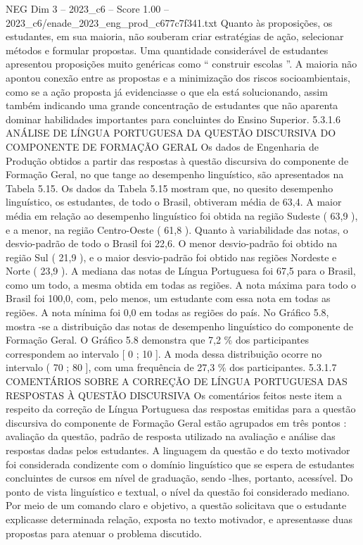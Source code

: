 \begin{textsample}{NEG Dim 3 – 2023\_c6 – Score 1.00 – 2023\_c6/enade\_2023\_eng\_prod\_c677c7f341.txt}
Quanto às proposições, os estudantes, em sua maioria, não souberam criar estratégias de ação, selecionar métodos e formular propostas.
Uma quantidade considerável de estudantes apresentou proposições muito genéricas como “ construir escolas ”.
A maioria não apontou conexão entre as propostas e a minimização dos riscos socioambientais, como se a ação proposta já evidenciasse o que ela está solucionando, assim também indicando uma grande concentração de estudantes que não aparenta dominar habilidades importantes para concluintes do Ensino Superior. 5.3.1.6 ANÁLISE DE LÍNGUA PORTUGUESA DA QUESTÃO DISCURSIVA DO COMPONENTE DE FORMAÇÃO GERAL Os dados de Engenharia de Produção obtidos a partir das respostas à questão discursiva do componente de Formação Geral, no que tange ao desempenho linguístico, são apresentados na Tabela 5.15.
Os dados da Tabela 5.15 mostram que, no quesito desempenho linguístico, os estudantes, de todo o Brasil, obtiveram média de 63,4.
A maior média em relação ao desempenho linguístico foi obtida na região Sudeste ( 63,9 ), e a menor, na região Centro-Oeste ( 61,8 ).
Quanto à variabilidade das notas, o desvio-padrão de todo o Brasil foi 22,6.
O menor desvio-padrão foi obtido na região Sul ( 21,9 ), e o maior desvio-padrão foi obtido nas regiões Nordeste e Norte ( 23,9 ).
A mediana das notas de Língua Portuguesa foi 67,5 para o Brasil, como um todo, a mesma obtida em todas as regiões.
A nota máxima para todo o Brasil foi 100,0, com, pelo menos, um estudante com essa nota em todas as regiões.
A nota mínima foi 0,0 em todas as regiões do país.
No Gráfico 5.8, mostra -se a distribuição das notas de desempenho linguístico do componente de Formação Geral.
O Gráfico 5.8 demonstra que 7,2 \% dos participantes correspondem ao intervalo [ 0 ; 10 ].
A moda dessa distribuição ocorre no intervalo ( 70 ; 80 ], com uma frequência de 27,3 \% dos participantes. 5.3.1.7 COMENTÁRIOS SOBRE A CORREÇÃO DE LÍNGUA PORTUGUESA DAS RESPOSTAS À QUESTÃO DISCURSIVA Os comentários feitos neste item a respeito da correção de Língua Portuguesa das respostas emitidas para a questão discursiva do componente de Formação Geral estão agrupados em três pontos : avaliação da questão, padrão de resposta utilizado na avaliação e análise das respostas dadas pelos estudantes.
A linguagem da questão e do texto motivador foi considerada condizente com o domínio linguístico que se espera de estudantes concluintes de cursos em nível de graduação, sendo -lhes, portanto, acessível.
Do ponto de vista linguístico e textual, o nível da questão foi considerado mediano.
Por meio de um comando claro e objetivo, a questão solicitava que o estudante explicasse determinada relação, exposta no texto motivador, e apresentasse duas propostas para atenuar o problema discutido.

\end{textsample}
